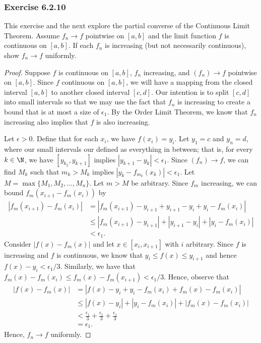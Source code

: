 \subsubsection{Exercise 6.2.10} This exercise and the next explore the partial converse of the Continuous Limit Theorem. Assume \( f_n \to f  \) pointwise on \( [a,b]  \) and the limit function \( f  \) is continuous on \( [a,b]  \). If each \( f_n  \) is increasing (but not necessarily continuous), show \( f_n \to f  \) uniformly.

\begin{proof}
    Suppose \( f  \) is continuous on \( [a,b]  \), \( f_n  \) increasing, and \( (f_n) \to f  \) pointwise on \( [a,b]  \). Since \( f  \) continuous on \( [a,b]  \), we will have a mapping from the closed interval \( [a,b]  \) to another closed interval \( [c,d]  \). Our intention is to split \( [c,d]  \) into small intervals so that we may use the fact that \( f_n  \) is increasing to create a bound that is at most a size of \( \epsilon_1 \). By the Order Limit Theorem, we know that \( f_n  \) increasing also implies that \( f  \) is also increasing. 

    Let \( \epsilon > 0  \). Define that for each \( x_i  \), we have \( f(x_i) = y_i   \). Let \( y_1 = c  \) and \( y_n = d  \), where our small intervals our defined as everything in between; that is, for every \( k \in \N  \), we have \( [y_{k_2 }, y_{k+1} ] \) implies \( | y_{k+1} - y_k  | < \epsilon_1 \).  Since \( (f_n) \to f  \), we can find \( M_k  \) such that \( m_k > M_k  \) implies \( | y_k - f_{m_k} (x_k)  | < \epsilon_1 \). Let \( M = \max \{ M_1, M_2, \dots, M_n  \}  \). Let \( m > M  \) be arbitrary. Since \( f_m  \) increasing, we can bound \( f_m(x_{i+1} - f_m(x_i) ) \) by 
    \begin{align*}
        | f_m(x_{i+1}) - f_m(x_i)  | &= | f_m(x_{i+1}) - y_{i+1} + y_{i+1} - y_i + y_i - f_m(x_i)  |  \\
                                     &\leq | f_m(x_{i+1}) - y_{i+1}  | + | y_{i+1} - y_i  | + | y_i - f_m(x_i)  | \\
                                     &< \epsilon_1.
    \end{align*}
    Consider \( | f(x) - f_m(x)  |  \) and let \( x \in [x_i, x_{i+1} ] \) with \( i  \) arbitrary. Since \( f  \) is increasing and \( f  \) is continuous, we know that \( y_i \leq f(x) \leq y_{i+1}  \) and hence \( f(x) -  y_i  < \epsilon_1 / 3 \). Similarly, we have that \( f_m(x) - f_m(x_i)  \leq f_m(x) - f_m(x_{i+1} ) < \epsilon_1 / 3 \). Hence, observe that 
    \begin{align*}
        | f(x) - f_m(x)  | &= | f(x) - y_i + y_i - f_m(x_i) + f_m(x) - f_m(x_i) |  \\
                           &\leq | f(x) - y_i | + | y_i - f_m(x_i)  | + | f_m(x) - f_m(x_i)  | \\
                           &< \frac{ \epsilon_1 }{ 3 } +  \frac{ \epsilon_1  }{ 3 } + \frac{ \epsilon_1  }{ 3  } \\
                           &= \epsilon_1.
    \end{align*}
    Hence, \( f_n \to f  \) uniformly.
\end{proof}

